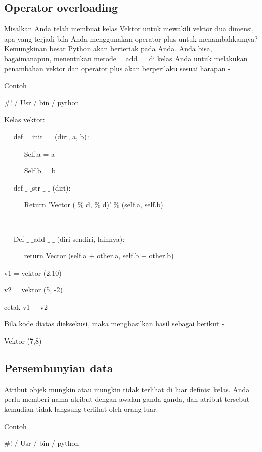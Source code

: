 {\subsection{Operator overloading}
Misalkan Anda telah membuat kelas Vektor untuk mewakili vektor dua dimensi, apa yang terjadi bila Anda menggunakan operator plus untuk menambahkannya? Kemungkinan besar Python akan berteriak pada Anda. Anda bisa, bagaimanapun, menentukan metode  $  \_  $ $  \_  $add $  \_  $ $  \_  $ di kelas Anda untuk melakukan penambahan vektor dan operator plus akan berperilaku sesuai harapan - \par
Contoh \par
\vspace{12pt}
\noindent 
 $  \#  $! / Usr / bin / python \par
\vspace{12pt}
\noindent 
Kelas vektor: \par
\noindent 
~~ def  $  \_  $ $  \_  $init  $  \_  $ $  \_  $ (diri, a, b): \par
\noindent 
~~~~~ Self.a = a \par
\noindent 
~~~~~ Self.b = b \par
\vspace{12pt}
\noindent 
~~ def  $  \_  $ $  \_  $str  $  \_  $ $  \_  $ (diri): \par
\noindent 
~~~~~ Return 'Vector ( $  \%  $ d, $  \%  $ d)' $  \%  $ (self.a, self.b) \par
\noindent 
~~  \par
\noindent 
~~ Def  $  \_  $ $  \_  $add  $  \_  $ $  \_  $ (diri sendiri, lainnya): \par
\noindent 
~~~~~ return Vector (self.a + other.a, self.b + other.b) \par
\vspace{12pt}
\noindent 
v1 = vektor (2,10) \par
\noindent 
v2 = vektor (5, -2) \par
\noindent 
cetak v1 + v2 \par
\vspace{12pt}
\noindent 
Bila kode diatas dieksekusi, maka menghasilkan hasil sebagai berikut - \par
\vspace{12pt}
\noindent 
Vektor (7,8) \par
\vspace{12pt}
\noindent 

\subsection{Persembunyian data}
Atribut objek mungkin atau mungkin tidak terlihat di luar definisi kelas. Anda perlu memberi nama atribut dengan awalan ganda ganda, dan atribut tersebut kemudian tidak langsung terlihat oleh orang luar. \par
Contoh \par
\vspace{12pt}
\noindent 
 $  \#  $! / Usr / bin / python \par
\vspace{12pt}
\noindent 

}
